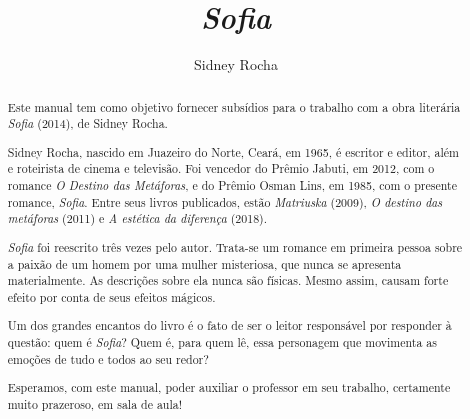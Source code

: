 \documentclass[12pt]{extarticle}
\begin{document}
\newcommand{\AutorLivro}{Sidney Rocha}
\newcommand{\TituloLivro}{\textit{Sofia}}
\newcommand{\Tema}{Ficção, mistério e fantasia}
\newcommand{\Genero}{Romance}
\newcommand{\imagemCapa}{./images/PNLD0054-01.png}
\newcommand{\issnppub}{---}
\newcommand{\issnepub}{---}
\newcommand{\colaborador}{Vicente Castro e Bruno Gradella}


\title{\TituloLivro} \author{\AutorLivro} \def\authornotes{\colaborador}

\date{} \maketitle

\baselineskip\par

\begin{abstract}

Este manual tem como objetivo fornecer subsídios para o trabalho com a obra
  literária \textit{Sofia} (2014), de Sidney Rocha.

Sidney Rocha, nascido em Juazeiro do Norte, Ceará, em 1965, é escritor e
  editor, além e roteirista de cinema e televisão. 
  Foi vencedor do Prêmio Jabuti, em
  2012, com o romance \textit{O Destino das Metáforas}, e do Prêmio Osman Lins,
  em 1985, com o presente romance, \textit{Sofia}. Entre 
  seus livros publicados, estão 
  \textit{Matriuska} (2009), 
  \textit{O destino das metáforas} (2011) e
  \textit{A estética da diferença} (2018).


\textit{Sofia} foi reescrito três vezes pelo autor. Trata-se um romance
  em primeira pessoa sobre a paixão de um homem por uma mulher misteriosa, 
  que nunca se apresenta materialmente. As descrições sobre ela nunca são físicas.
  Mesmo assim, causam forte efeito por conta de seus efeitos mágicos. 

Um dos grandes encantos do livro é o fato de ser o
  leitor responsável por responder à questão: quem é \textit{Sofia}? Quem é, para quem
  lê, essa personagem que movimenta as emoções de tudo e todos ao seu redor?

Esperamos, com este manual, poder auxiliar o professor em seu trabalho,
  certamente muito prazeroso, em sala de aula!


\end{abstract}

\tableofcontents

\end{document}
